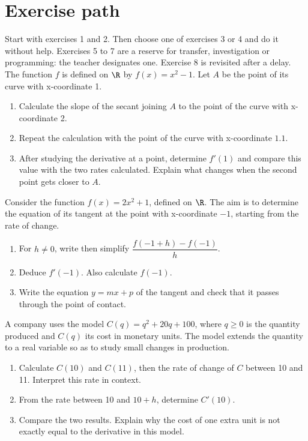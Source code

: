\section*{Exercise path}\label{C04-PARC}
Start with exercises 1 and 2. Then choose one of exercises 3 or 4 and do it without help. Exercises 5 to 7 are a reserve for transfer, investigation or programming: the teacher designates one. Exercise 8 is revisited after a delay.
\begingroup
{}
The function $f$ is defined on $\R$ by $f(x)=x^2-1$. Let $A$ be the point of its curve with x-coordinate 1.
\begin{enumerate}[label=\arabic*.]
\item Calculate the slope of the secant joining $A$ to the point of the curve with x-coordinate 2.
\item Repeat the calculation with the point of the curve with x-coordinate $1.1$.
\item After studying the derivative at a point, determine $f\prime(1)$ and compare this value with the two rates calculated. Explain what changes when the second point gets closer to $A$.
\end{enumerate}
Consider the function $f(x)=2x^2+1$, defined on $\R$. The aim is to determine the equation of its tangent at the point with x-coordinate $-1$, starting from the rate of change.
\begin{enumerate}[label=\arabic*.]
\item For $h\ne0$, write then simplify $\dfrac{f(-1+h)-f(-1)}{h}$.
\item Deduce $f\prime(-1)$. Also calculate $f(-1)$.
\item Write the equation $y=mx+p$ of the tangent and check that it passes through the point of contact.
\end{enumerate}
A company uses the model $C(q)=q^2+20q+100$, where $q\geq0$ is the quantity produced and $C(q)$ its cost in monetary units. The model extends the quantity to a real variable so as to study small changes in production.
\begin{enumerate}[label=\arabic*.]
\item Calculate $C(10)$ and $C(11)$, then the rate of change of $C$ between 10 and 11. Interpret this rate in context.
\item From the rate between 10 and $10+h$, determine $C\prime(10)$.
\item Compare the two results. Explain why the cost of one extra unit is not exactly equal to the derivative in this model.
\end{enumerate}
